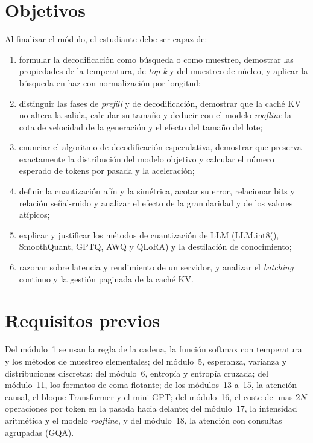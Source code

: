 \documentclass[11pt,a4paper,twoside,openany]{book}
\begin{document}
\section*{Objetivos}
Al finalizar el módulo, el estudiante debe ser capaz de:
\begin{enumerate}[label=\arabic*.]
  \item formular la decodificación como búsqueda o como muestreo, demostrar las propiedades de la temperatura, de \emph{top-k} y del muestreo de núcleo, y aplicar la búsqueda en haz con normalización por longitud;
  \item distinguir las fases de \emph{prefill} y de decodificación, demostrar que la caché KV no altera la salida, calcular su tamaño y deducir con el modelo \emph{roofline} la cota de velocidad de la generación y el efecto del tamaño del lote;
  \item enunciar el algoritmo de decodificación especulativa, demostrar que preserva exactamente la distribución del modelo objetivo y calcular el número esperado de tokens por pasada y la aceleración;
  \item definir la cuantización afín y la simétrica, acotar su error, relacionar bits y relación señal-ruido y analizar el efecto de la granularidad y de los valores atípicos;
  \item explicar y justificar los métodos de cuantización de LLM (LLM.int8(), SmoothQuant, GPTQ, AWQ y QLoRA) y la destilación de conocimiento;
  \item razonar sobre latencia y rendimiento de un servidor, y analizar el \emph{batching} continuo y la gestión paginada de la caché KV.
\end{enumerate}

\section*{Requisitos previos}
Del módulo~1 se usan la regla de la cadena, la función softmax con temperatura y los métodos de muestreo elementales; del módulo~5, esperanza, varianza y distribuciones discretas; del módulo~6, entropía y entropía cruzada; del módulo~11, los formatos de coma flotante; de los módulos~13 a~15, la atención causal, el bloque Transformer y el mini-GPT; del módulo~16, el coste de unas $2N$ operaciones por token en la pasada hacia delante; del módulo~17, la intensidad aritmética y el modelo \emph{roofline}, y del módulo~18, la atención con consultas agrupadas (GQA).
\end{document}
